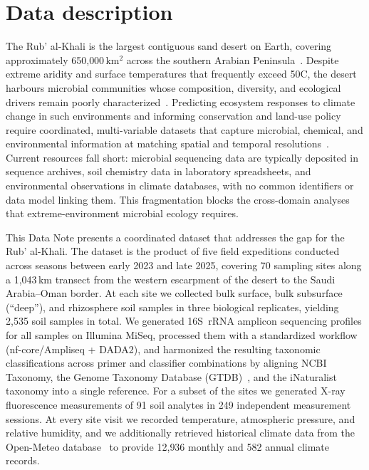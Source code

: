 \documentclass[11pt,a4paper]{article}
\begin{document}
\section{Data description}

The Rub' al-Khali is the largest contiguous sand desert on Earth,
covering approximately 650{,}000\,km$^2$ across the southern Arabian
Peninsula~\cite{mandaville_1986}. Despite extreme aridity and surface
temperatures that frequently exceed 50\degree C, the desert harbours
microbial communities whose composition, diversity, and ecological
drivers remain poorly
characterized~\cite{makhalanyane2015}. Predicting ecosystem responses
to climate change in such environments and informing conservation and
land-use policy require coordinated, multi-variable datasets that
capture microbial, chemical, and environmental information at matching
spatial and temporal resolutions~\cite{fierer2017}. Current resources
fall short: microbial sequencing data are typically deposited in
sequence archives, soil chemistry data in laboratory spreadsheets, and
environmental observations in climate databases, with no common
identifiers or data model linking them. This fragmentation blocks the
cross-domain analyses that extreme-environment microbial ecology
requires.

This Data Note presents a coordinated dataset that addresses the gap
for the Rub' al-Khali. The dataset is the product of five field
expeditions conducted across seasons between early 2023 and late
2025, covering 70 sampling sites along a 1{,}043\,km transect from the
western escarpment of the desert to the Saudi Arabia--Oman border. At
each site we collected bulk surface, bulk subsurface (``deep''), and
rhizosphere soil samples in three biological replicates, yielding
2{,}535 soil samples in total. We generated 16S~rRNA amplicon
sequencing profiles for all samples on Illumina MiSeq, processed them
with a standardized workflow (nf-core/Ampliseq + DADA2), and
harmonized the resulting taxonomic classifications across primer and
classifier combinations by aligning NCBI Taxonomy, the Genome Taxonomy
Database (GTDB)~\cite{gtdb}, and the iNaturalist taxonomy into a
single reference. For a subset of the sites we generated X-ray
fluorescence measurements of 91 soil analytes in 249 independent
measurement sessions. At every site visit we recorded temperature,
atmospheric pressure, and relative humidity, and we additionally
retrieved historical climate data from the Open-Meteo
database~\cite{openmeteo} to provide 12{,}936 monthly and 582 annual
climate records.
\end{document}
